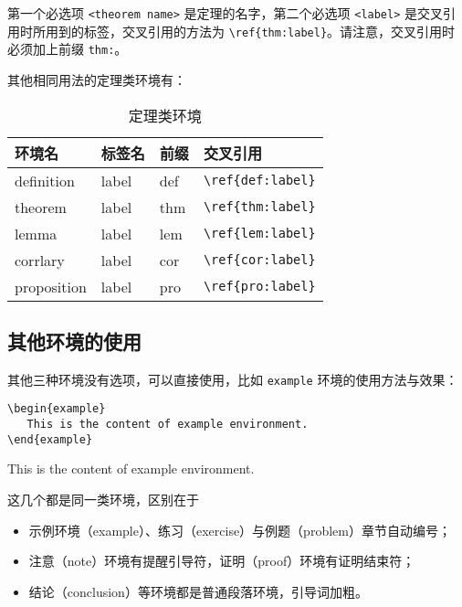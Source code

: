 \documentclass[cn,11pt,fancy,hide]{elegantbook}
\begin{document}
第一个必选项 \lstinline{<theorem name>} 是定理的名字，第二个必选项 \lstinline{<label>} 是交叉引用时所用到的标签，交叉引用的方法为 \verb|\ref{thm:label}|。请注意，交叉引用时必须加上前缀 \lstinline{thm:}。

其他相同用法的定理类环境有：

\begin{table}[htbp]
   \centering
   \caption{定理类环境}
     \begin{tabular}{llll}
     \toprule
     环境名 & 标签名 & 前缀 & 交叉引用 \\
     \midrule
     definition & label & def   & \lstinline|\ref{def:label}| \\
     theorem & label & thm   & \lstinline|\ref{thm:label}| \\
     lemma & label & lem   & \lstinline|\ref{lem:label}| \\
     corrlary & label & cor   & \lstinline|\ref{cor:label}| \\
     proposition & label & pro   & \lstinline|\ref{pro:label}| \\
     \bottomrule
     \end{tabular}%
   \label{tab:theorem-class}%
 \end{table}%
 

\subsection{其他环境的使用}
其他三种环境没有选项，可以直接使用，比如 \lstinline{example} 环境的使用方法与效果：
\begin{lstlisting}
\begin{example}
   This is the content of example environment.
\end{example}
\end{lstlisting}

\begin{example}
This is the content of example environment.
\end{example}


这几个都是同一类环境，区别在于

\begin{itemize}
   \item 示例环境（example）、练习（exercise）与例题（problem）章节自动编号；
   \item 注意（note）环境有提醒引导符，证明（proof）环境有证明结束符；
   \item 结论（conclusion）等环境都是普通段落环境，引导词加粗。
\end{itemize}
\end{document}
